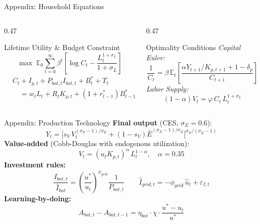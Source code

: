 \documentclass[aspectratio=169,10pt]{beamer}
\begin{document}
\appendix

\begin{frame}{Appendix: Household Equations}
  \begin{columns}[T]
    \begin{column}{0.47\textwidth}
      \begin{block}{Lifetime Utility \& Budget Constraint}
        \[
          \max \;\mathbb{E}_0 \sum_{t=0}^{\infty}\beta^t
          \!\left[\log C_t - \frac{L_t^{1+\sigma_L}}{1+\sigma_L}\right]
        \]
        \begin{align*}
          &C_t + I_{p,t} + P_{bat,t}I_{bat,t} + B^*_t + T_t\\
          &\quad= w_t L_t + R_t K_{p,t} + (1+r^*_{t-1})B^*_{t-1}
        \end{align*}
      \end{block}
    \end{column}
    \begin{column}{0.47\textwidth}
      \begin{block}{Optimality Conditions}
        \textit{Capital Euler:}
        \[
          \frac{1}{C_t}=\beta\,\mathbb{E}_t\!\left[\frac{\alpha Y_{t+1}/K_{p,t+1}+1-\delta_p}{C_{t+1}}\right]
        \]
        \textit{Labor Supply:}
        \[
          (1-\alpha)V_t = \varphi\,C_t\,L_t^{1+\sigma_L}
        \]
      \end{block}
    \end{column}
  \end{columns}
\end{frame}

\begin{frame}{Appendix: Production Technology}
  \textbf{Final output} (CES, $\sigma_E = 0.6$):
  \[
    Y_t = \bigl[s_V\,V_t^{(\sigma_E-1)/\sigma_E} + (1-s_V)\bar{E}^{(\sigma_E-1)/\sigma_E}\bigr]^{\sigma_E/(\sigma_E-1)}
  \]
  \textbf{Value-added} (Cobb-Douglas with endogenous utilization):
  \[
    V_t = (u_t K_{p,t})^\alpha\,L_t^{1-\alpha}, \quad \alpha=0.35
  \]
  \textbf{Investment rules:}
  \[
    \frac{I_{bat,t}}{\bar{I}_{bat}} = \left(\frac{u^*}{u_t}\right)^{\phi_{grid}}\!\!\frac{1}{P_{bat,t}}
    \qquad
    \hat{I}_{grid,t} = -\phi_{grid}\,\hat{u}_t + \varepsilon_{I,t}
  \]
  \textbf{Learning-by-doing:}
  \[
    A_{bat,t} - A_{bat,t-1} = \eta_{bat}\cdot\chi\cdot\frac{u^*-u_t}{u^*}
  \]
\end{frame}
\end{document}
